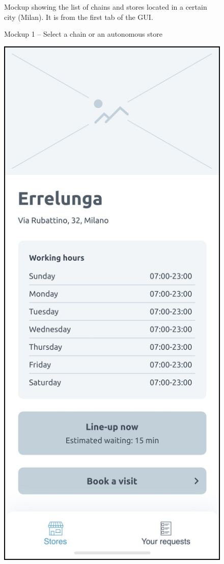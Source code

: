 \documentclass[a4paper,oneside,11pt]{book}
\newcommand{\captiondd}[2]{\caption{#1}\par\begin{center}\vspace{-.01\textheight}\small#2.\end{center}}
\begin{document}
\begin{multicols}{2}
\begin{figure}[H]
            \captiondd{Mockup 1 -- Select a chain or an autonomous store}{Mockup showing the list of chains and stores located in a certain city (Milan). It is from the first tab of the GUI}
            \label{figure:mockup_1}
        \end{figure}
        \begin{figure}[H]
            \centering
            \includegraphics[width=\textwidth, height=.55\textheight, keepaspectratio]{pictures/mockups/store_view}

\end{figure}
\end{multicols}
\end{document}
